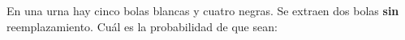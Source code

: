 \documentclass[addpoints,spanish, 12pt,a4paper]{exam}
\begin{document}
\begin{questions}
\begin{parts}

\question En una urna hay cinco bolas blancas y cuatro negras. Se extraen dos bolas \textbf{sin} reemplazamiento. Cuál es la probabilidad de que sean: 


\end{parts}
\end{questions}
\end{document}
